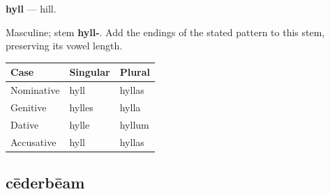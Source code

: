 \par\begin{minipage}{\linewidth}\raggedright
\textbf{hyll} — hill.

Masculine; stem \textbf{hyll-}. Add the endings of the stated pattern to this stem, preserving its vowel length.

\par\begingroup
\fontsize{10.5}{13.2}\selectfont
\setlength{\LTleft}{0pt}\setlength{\LTright}{\fill}
\noindent
\begin{tabular}{@{}>{\raggedright\arraybackslash}p{39.46mm}>{\raggedright\arraybackslash}p{39.46mm}>{\raggedright\arraybackslash}p{39.46mm}@{}}
\toprule
\textbf{Case} & \textbf{Singular} & \textbf{Plural} \\
\midrule
Nominative & hyll & hyllas \\
Genitive & hylles & hylla \\
Dative & hylle & hyllum \\
Accusative & hyll & hyllas \\
\bottomrule
\end{tabular}
\par\endgroup

\end{minipage}\par
{}
\subsection*{cēderbēam}

